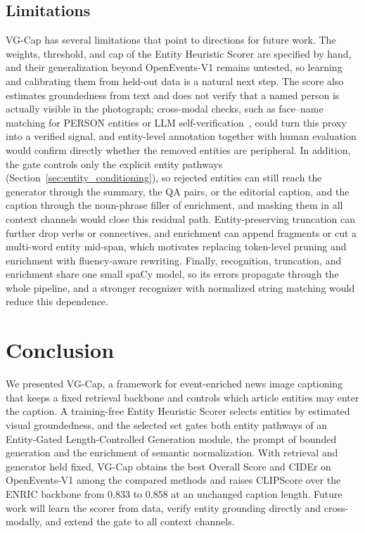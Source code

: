 \documentclass[runningheads]{llncs}
\DeclareRobustCommand{\aciids}[1]{{\color{olive}#1}}
\DeclareRobustCommand{\revise}[1]{{\color{blue}#1}}
\DeclareRobustCommand{\aciids}[1]{#1}
\DeclareRobustCommand{\revise}[1]{#1}
\begin{document}
\subsection{Limitations}
\label{sec:limitations}

\revise{VG-Cap has several limitations that point to directions for future work. The weights, threshold, and cap of the Entity Heuristic Scorer are specified by hand, and their generalization beyond OpenEvents-V1 remains untested, so learning and calibrating them from held-out data is a natural next step. The score also estimates groundedness from text and does not verify that a named person is actually visible in the photograph; cross-modal checks, such as face--name matching for PERSON entities or LLM self-verification~\cite{asai2024selfrag}, could turn this proxy into a verified signal, and entity-level annotation together with human evaluation would confirm directly whether the removed entities are peripheral. In addition, the gate controls only the explicit entity pathways (Section~\ref{sec:entity_conditioning}), so rejected entities can still reach the generator through the summary, the QA pairs, or the editorial caption\revise{, and the caption through the noun-phrase filler of enrichment}, and masking them in all context channels would close this residual path. Entity-preserving truncation can further drop verbs or connectives, and enrichment can append fragments or cut a multi-word entity mid-span, which motivates replacing token-level pruning and enrichment with fluency-aware rewriting. Finally, recognition, truncation, and enrichment share one small spaCy model, so its errors propagate through the whole pipeline, and a stronger recognizer with normalized string matching would reduce this dependence.}

\section{Conclusion}
\label{sec:conclusion}

\aciids{We presented VG-Cap, a framework for event-enriched news image captioning that keeps a fixed retrieval backbone and controls which article entities may enter the caption. A training-free Entity Heuristic Scorer selects entities by estimated visual groundedness, and the selected set gates both entity pathways of an Entity-Gated Length-Controlled Generation module, the prompt of bounded generation and the enrichment of semantic normalization. With retrieval and generator held fixed, VG-Cap obtains the best Overall Score and CIDEr on OpenEvents-V1 among the compared methods and raises CLIPScore over the ENRIC backbone from $0.833$ to $0.858$ at an unchanged caption length. Future work will learn the scorer from data, verify entity grounding directly and cross-modally, and extend the gate to all context channels.}
\end{document}
